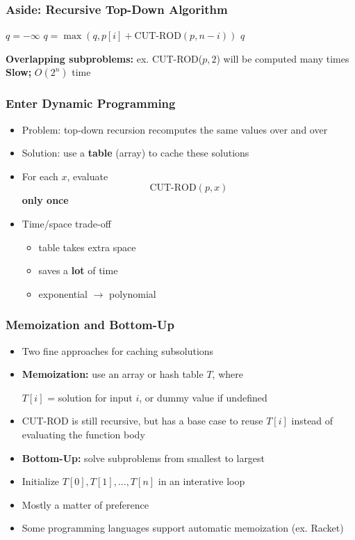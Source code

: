 \documentclass{beamer}
\begin{document}
\begin{frame} \frametitle{Aside: Recursive Top-Down Algorithm}
  {\small
    \begin{algorithmic}[1]
        \State {}
      \EndIf
      \State $q = -\infty$
        \State $q = \max(q, p[i] + \text{CUT-ROD}(p, n-i))$
      \EndFor
      \State \Return $q$
    \EndFunction
    \end{algorithmic}
  }
  \vspace{.5cm}

    \textbf{Overlapping subproblems:} ex. CUT-ROD($p, 2$) will be computed many times \\
    \textbf{Slow;} $O(2^n)$ time
\end{frame}

\begin{frame} \frametitle{Enter Dynamic Programming}
  \begin{itemize}
  \item Problem: top-down recursion recomputes the same values over and over
  \item Solution: use a \textbf{table} (array) to cache these solutions
  \item For each $x$, evaluate
    \[ \text{CUT-ROD}(p, x) \]
    \textbf{only once}
  \item Time/space trade-off
    \begin{itemize}
    \item table takes extra space
    \item saves a \textbf{lot} of time
    \item exponential $\longrightarrow$ polynomial
    \end{itemize}
  \end{itemize}
\end{frame}

\begin{frame} \frametitle{Memoization and Bottom-Up}
  \begin{itemize}
  \item Two fine approaches for caching subsolutions
  \item \textbf{Memoization:} use an array or hash table $T$, where
    \begin{center}
      $T[i]$ = solution for input $i$, or dummy value if undefined
    \end{center}
  \item CUT-ROD is still recursive, but has a base case to reuse $T[i]$ instead of evaluating the function body
  \item \textbf{Bottom-Up:} solve subproblems from smallest to largest
  \item Initialize $T[0], T[1], \ldots, T[n]$ in an interative loop
  \item Mostly a matter of preference
  \item Some programming languages support automatic memoization (ex. Racket)
  \end{itemize}
  \end{frame}
\end{document}
